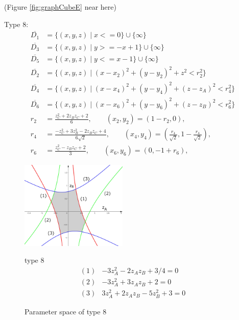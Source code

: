 \documentclass[suppldata, dvipdfmx]{interact}
\theoremstyle{plain}%
\theoremstyle{definition}
\theoremstyle{remark}
\theoremstyle{problemstyle}
\begin{document}
\noindent(Figure \ref{fig:graphCubeE} near here)
\bigskip\par
Type 8:
\begin{align*}
\overline{D_1}&=\{ (x,y,z) \mid x <= 0 \} \cup \{ \infty \}\\
\overline{D_3}&=\{(x,y,z) \mid y >= -x + 1 \} \cup\{\infty\}\\
\overline{D_5}&=\{(x,y,z) \mid y <= x - 1 \} \cup\{\infty\}\\
\overline{D_2}&=\{(x,y,z) \mid (x-x_2)^2+(y-y_2)^2+z^2<r_2^2 \} \\
\overline{D_4}&=\{(x,y,z) \mid (x-x_4)^2+(y-y_4)^2+(z-z_A)^2<r_4^2 \} \\
\overline{D_6}&=\{(x,y,z) \mid (x-x_6)^2+(y-y_6)^2+(z-z_B)^2<r_6^2 \} \\
 r_2 &= \frac{z_C^2 + 2z_Bz_C + 2}{6}, \qquad
(x_2, y_2) = \left(1 - r_2, 0\right),\\
 r_4 &= \frac{-z_C^2 + 3z_B^2 - 2z_Bz_C + 4}{6\sqrt{2}}, \qquad
(x_4, y_4) = \left(\frac{r_4}{\sqrt{2}}, 1 - \frac{r_4}{\sqrt{2}}\right),\\
 r_6 &= \frac{z_C^2 - z_Bz_C + 2}{3}, \qquad
(x_6, y_6) = \left(0, -1 + r_6\right),
\end{align*} 
\begin{figure}[h]
 \begin{minipage}[]{0.5\textwidth}
 \centering
 \includegraphics[width=2in,
 keepaspectratio]{./img/graph/cubeH.jpg}
 \caption{Parameter space of type 8}
 \label{fig:graphCubeH}
 \end{minipage}
 \hspace*{\fill}
 \begin{minipage}[]{0.5\textwidth}
  \centering
  type 8
  \begin{align*}
   (1)& -3z_A^2 - 2z_Az_B + 3/4 = 0\\
   (2)& -3z_A^2 + 3 z_Az_B + 2 = 0\\
   (3)&  3z_A^2 + 2z_Az_B -5z_B^2 + 3 = 0
  \end{align*}
 \end{minipage}
 \hspace*{\fill}
\end{figure}
\end{document}
